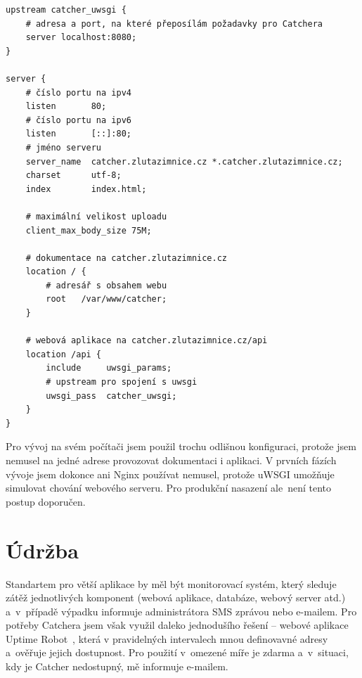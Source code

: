 \begingroup
\fontsize{9.5pt}{11pt}\selectfont
\begin{verbatim}
upstream catcher_uwsgi {
    # adresa a port, na které přeposílám požadavky pro Catchera
    server localhost:8080;
}

server {
    # číslo portu na ipv4
    listen       80;
    # číslo portu na ipv6
    listen       [::]:80;
    # jméno serveru
    server_name  catcher.zlutazimnice.cz *.catcher.zlutazimnice.cz;
    charset      utf-8;
    index        index.html;
    
    # maximální velikost uploadu
    client_max_body_size 75M;

    # dokumentace na catcher.zlutazimnice.cz
    location / {
        # adresář s obsahem webu
        root   /var/www/catcher;
    }

    # webová aplikace na catcher.zlutazimnice.cz/api
    location /api {
        include     uwsgi_params;
        # upstream pro spojení s uwsgi
        uwsgi_pass  catcher_uwsgi;
    }
}
\end{verbatim}
\endgroup

Pro vývoj na svém počítači jsem použil trochu odlišnou konfiguraci, protože
jsem nemusel na jedné adrese provozovat dokumentaci i aplikaci.
V prvních fázích vývoje jsem dokonce ani Nginx používat nemusel, protože uWSGI umožňuje simulovat
chování webového serveru.
Pro produkční nasazení ale~není tento postup doporučen.

\section{Údržba}

Standartem pro větší aplikace by měl být monitorovací systém,
který sleduje zátěž jednotlivých komponent (webová aplikace, databáze, webový server atd.)
a~v~případě výpadku informuje administrátora SMS zprávou nebo e-mailem.
Pro potřeby Catchera jsem však využil daleko jednodušího řešení -- webové aplikace Uptime Robot~\cite{uptime_robot},
která v pravidelných intervalech  mnou definovavné adresy a~ověřuje jejich dostupnost.
Pro použití v~omezené míře je zdarma a~v~situaci, kdy je Catcher nedostupný, mě informuje e-mailem.







